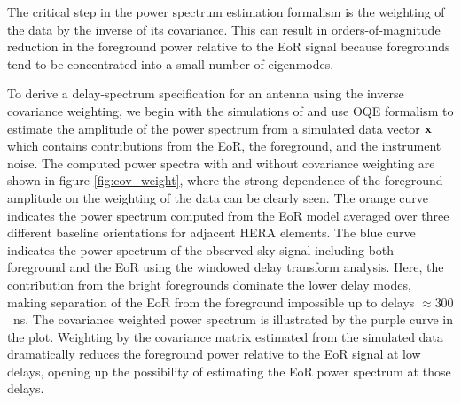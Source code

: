 \documentclass[twocolumn]{emulateapj}
\begin{document}
    
  The critical step in the power spectrum estimation formalism is the weighting of the data by the inverse of its covariance. This can result in orders-of-magnitude reduction in the foreground power relative to the EoR signal because foregrounds tend to be concentrated into a small number of eigenmodes. 

To derive a delay-spectrum specification for an antenna using the inverse covariance weighting, we begin
with the
   simulations of \cite{Thyagarajan_et_al2016} and use OQE formalism to estimate the amplitude of the power spectrum
from a simulated data vector $\bold x$ 
    which contains contributions from the EoR, the foreground, and
   the instrument noise. The computed power spectra with and without covariance weighting are shown in figure \ref{fig:cov_weight}, where the strong dependence of the foreground amplitude on the weighting of the data can be clearly seen. The orange curve indicates the power spectrum computed from the EoR model averaged over three different baseline orientations for adjacent HERA elements.  The blue curve indicates the power spectrum of the observed sky signal including both foreground and the EoR using the windowed delay transform analysis. Here, the contribution from the bright foregrounds dominate the lower delay modes, making separation of the EoR from the foreground impossible up to delays $\approx 300$ ~ns. 
The covariance weighted power spectrum is illustrated by the purple curve in the plot. 
   Weighting by the covariance matrix estimated from the simulated data dramatically reduces the foreground power relative to the EoR signal at low delays, opening up the possibility of estimating the EoR power spectrum at those delays. 
\end{document}
